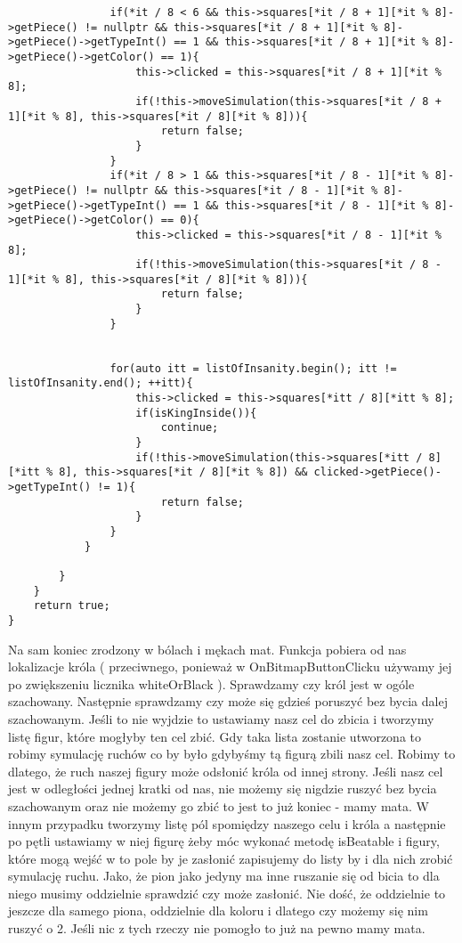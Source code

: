 \documentclass[]{report}
\begin{document}
\begin{flushleft}
\begin{lstlisting}
				if(*it / 8 < 6 && this->squares[*it / 8 + 1][*it % 8]->getPiece() != nullptr && this->squares[*it / 8 + 1][*it % 8]->getPiece()->getTypeInt() == 1 && this->squares[*it / 8 + 1][*it % 8]->getPiece()->getColor() == 1){
					this->clicked = this->squares[*it / 8 + 1][*it % 8];
					if(!this->moveSimulation(this->squares[*it / 8 + 1][*it % 8], this->squares[*it / 8][*it % 8])){
						return false;
					}
				}
				if(*it / 8 > 1 && this->squares[*it / 8 - 1][*it % 8]->getPiece() != nullptr && this->squares[*it / 8 - 1][*it % 8]->getPiece()->getTypeInt() == 1 && this->squares[*it / 8 - 1][*it % 8]->getPiece()->getColor() == 0){
					this->clicked = this->squares[*it / 8 - 1][*it % 8];
					if(!this->moveSimulation(this->squares[*it / 8 - 1][*it % 8], this->squares[*it / 8][*it % 8])){
						return false;
					}
				}
				
				
				for(auto itt = listOfInsanity.begin(); itt != listOfInsanity.end(); ++itt){
					this->clicked = this->squares[*itt / 8][*itt % 8];
					if(isKingInside()){
						continue;
					}
					if(!this->moveSimulation(this->squares[*itt / 8][*itt % 8], this->squares[*it / 8][*it % 8]) && clicked->getPiece()->getTypeInt() != 1){
						return false;
					}
				}
			}
			
		}
	}
	return true;
}
\end{lstlisting}
\vspace{\baselineskip}
Na sam koniec zrodzony w bólach i mękach mat. Funkcja pobiera od nas lokalizacje króla ( przeciwnego, ponieważ w OnBitmapButtonClicku używamy jej po zwiększeniu licznika whiteOrBlack ). Sprawdzamy czy król jest w ogóle szachowany. Następnie sprawdzamy czy może się gdzieś poruszyć bez bycia dalej szachowanym. Jeśli to nie wyjdzie to ustawiamy nasz cel do zbicia i tworzymy listę figur, które mogłyby ten cel zbić. Gdy taka lista zostanie utworzona to robimy symulację ruchów co by było gdybyśmy tą figurą zbili nasz cel. Robimy to dlatego, że ruch naszej figury może odsłonić króla od innej strony. Jeśli nasz cel jest w odległości jednej kratki od nas, nie możemy się nigdzie ruszyć bez bycia szachowanym oraz nie możemy go zbić to jest to już koniec - mamy mata. W innym przypadku tworzymy listę pól spomiędzy naszego celu i króla a następnie po pętli ustawiamy w niej figurę żeby móc wykonać metodę isBeatable i figury, które mogą wejść w to pole by je zasłonić zapisujemy do listy by i dla nich zrobić symulację ruchu. Jako, że pion jako jedyny ma inne ruszanie się od bicia to dla niego musimy oddzielnie sprawdzić czy może zasłonić. Nie dość, że oddzielnie to jeszcze dla samego piona, oddzielnie dla koloru i dlatego czy możemy się nim ruszyć o 2. Jeśli nic z tych rzeczy nie pomogło to już na pewno mamy mata.
\vspace{\baselineskip}
\newline

\end{flushleft}
\end{document}
